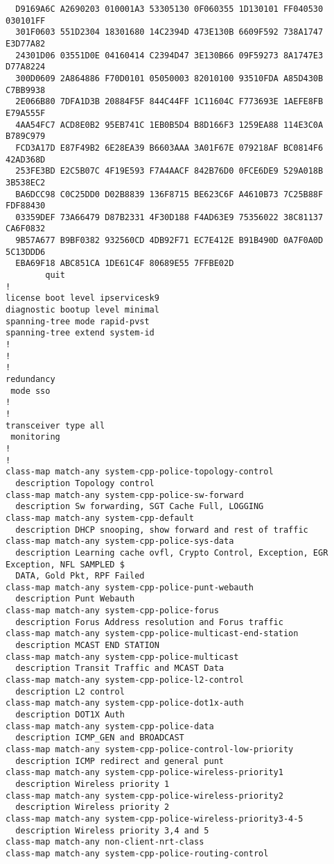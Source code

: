\begin{verbatim}
  D9169A6C A2690203 010001A3 53305130 0F060355 1D130101 FF040530 030101FF
  301F0603 551D2304 18301680 14C2394D 473E130B 6609F592 738A1747 E3D77A82
  24301D06 03551D0E 04160414 C2394D47 3E130B66 09F59273 8A1747E3 D77A8224
  300D0609 2A864886 F70D0101 05050003 82010100 93510FDA A85D430B C7BB9938
  2E066B80 7DFA1D3B 20884F5F 844C44FF 1C11604C F773693E 1AEFE8FB E79A555F
  4AA54FC7 ACD8E0B2 95EB741C 1EB0B5D4 B8D166F3 1259EA88 114E3C0A B789C979
  FCD3A17D E87F49B2 6E28EA39 B6603AAA 3A01F67E 079218AF BC0814F6 42AD368D
  253FE3BD E2C5B07C 4F19E593 F7A4AACF 842B76D0 0FCE6DE9 529A018B 3B538EC2
  BA6DCC98 C0C25DD0 D02B8839 136F8715 BE623C6F A4610B73 7C25B88F FDF88430
  03359DEF 73A66479 D87B2331 4F30D188 F4AD63E9 75356022 38C81137 CA6F0832
  9B57A677 B9BF0382 932560CD 4DB92F71 EC7E412E B91B490D 0A7F0A0D 5C13DDD6
  EBA69F18 ABC851CA 1DE61C4F 80689E55 7FFBE02D
        quit
!
license boot level ipservicesk9
diagnostic bootup level minimal
spanning-tree mode rapid-pvst
spanning-tree extend system-id
!
!
!
redundancy
 mode sso
!
!
transceiver type all
 monitoring
!
!
class-map match-any system-cpp-police-topology-control
  description Topology control
class-map match-any system-cpp-police-sw-forward
  description Sw forwarding, SGT Cache Full, LOGGING
class-map match-any system-cpp-default
  description DHCP snooping, show forward and rest of traffic
class-map match-any system-cpp-police-sys-data
  description Learning cache ovfl, Crypto Control, Exception, EGR Exception, NFL SAMPLED $
  DATA, Gold Pkt, RPF Failed
class-map match-any system-cpp-police-punt-webauth
  description Punt Webauth
class-map match-any system-cpp-police-forus
  description Forus Address resolution and Forus traffic
class-map match-any system-cpp-police-multicast-end-station
  description MCAST END STATION
class-map match-any system-cpp-police-multicast
  description Transit Traffic and MCAST Data
class-map match-any system-cpp-police-l2-control
  description L2 control
class-map match-any system-cpp-police-dot1x-auth
  description DOT1X Auth
class-map match-any system-cpp-police-data
  description ICMP_GEN and BROADCAST
class-map match-any system-cpp-police-control-low-priority
  description ICMP redirect and general punt
class-map match-any system-cpp-police-wireless-priority1
  description Wireless priority 1
class-map match-any system-cpp-police-wireless-priority2
  description Wireless priority 2
class-map match-any system-cpp-police-wireless-priority3-4-5
  description Wireless priority 3,4 and 5
class-map match-any non-client-nrt-class
class-map match-any system-cpp-police-routing-control

\end{verbatim}
